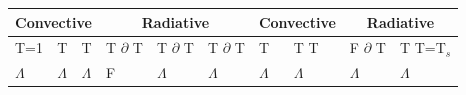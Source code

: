 \begin{table}
\begin{tabular}{|*{10}{l|}}
\hline
\multicolumn{3}{|c|}{Convective} & \multicolumn{3}{c|}{Radiative} &
\multicolumn{2}{c|}{Convective} & \multicolumn{2}{c|}{Radiative} \\
\hline
T=1\hspace*{4mm} & T\hspace*{4mm}  &
T\hspace*{4mm}  & T\hspace*{4mm} $\partial$ T &
T\hspace*{4mm} $\partial$ T & T\hspace*{4mm} $\partial$ T&
T\hspace*{4mm}  & T\hspace*{4mm} T &
F\hspace*{4mm} $\partial$ T & T\hspace*{4mm}  T=T$_s$ \\
\hline
\hspace*{4mm}$\Lambda$ & \hspace*{4mm} $\Lambda$ &
\hspace*{4mm} $\Lambda$   & F\hspace*{4mm}          &
$\Lambda$\hspace*{4mm}    & $\Lambda$\hspace*{4mm}  &
$\Lambda$\hspace*{4mm}    & $\Lambda$\hspace*{4mm}  &
$\Lambda$\hspace*{4mm} & $\Lambda$\hspace*{4mm}  \\
\hline
\end{tabular}


\end{table}
